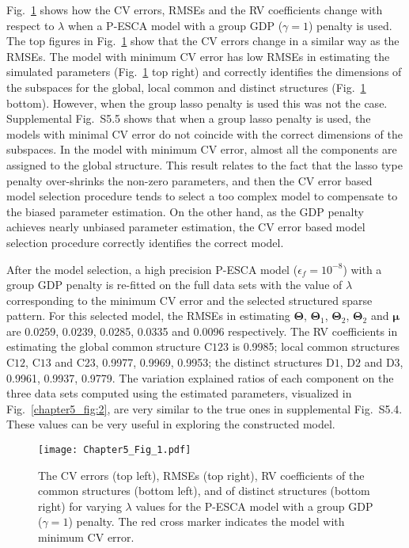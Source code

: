 Fig.~\ref{chapter5_fig:1} shows how the CV errors, RMSEs and the RV coefficients change with respect to $\lambda$ when a P-ESCA model with a group GDP ($\gamma=1$) penalty is used. The top figures in Fig.~\ref{chapter5_fig:1} show that the CV errors change in a similar way as the RMSEs. The model with minimum CV error has low RMSEs in estimating the simulated parameters (Fig.~\ref{chapter5_fig:1} top right) and correctly identifies the dimensions of the subspaces for the global, local common and distinct structures (Fig.~\ref{chapter5_fig:1} bottom). However, when the group lasso penalty is used this was not the case. Supplemental Fig.~S5.5 shows that when a group lasso penalty is used, the models with minimal CV error do not coincide with the correct dimensions of the subspaces. In the model with minimum CV error, almost all the components are assigned to the global structure. This result relates to the fact that the lasso type penalty over-shrinks the non-zero parameters, and then the CV error based model selection procedure tends to select a too complex model to compensate to the biased parameter estimation. On the other hand, as the GDP penalty achieves nearly unbiased parameter estimation, the CV error based model selection procedure correctly identifies the correct model.

After the model selection, a high precision P-ESCA model ($\epsilon_{f} = 10^{-8}$) with a group GDP penalty is re-fitted on the full data sets with the value of $\lambda$ corresponding to the minimum CV error and the selected structured sparse pattern. For this selected model, the RMSEs in estimating $\mathbf{\Theta}$, $\mathbf{\Theta}_1$, $\mathbf{\Theta}_2$, $\mathbf{\Theta}_2$ and $\bm{\mu}$ are 0.0259, 0.0239, 0.0285, 0.0335 and 0.0096 respectively. The RV coefficients in estimating the global common structure $\text{C123}$ is 0.9985; local common structures $\text{C12}$, $\text{C13}$ and $\text{C23}$, 0.9977, 0.9969, 0.9953; the distinct structures $\text{D1}$, $\text{D2}$ and $\text{D3}$, 0.9961, 0.9937, 0.9779. The variation explained ratios of each component on the three data sets computed using the estimated parameters, visualized in Fig.~\ref{chapter5_fig:2}, are very similar to the true ones in supplemental Fig.~S5.4. These values can be very useful in exploring the constructed model.

\begin{figure}[h]
    \center
    \texttt{[image: Chapter5\_Fig\_1.pdf]}
    \caption{The CV errors (top left), RMSEs (top right), RV coefficients of the common structures (bottom left), and of distinct structures (bottom right) for varying $\lambda$ values for the P-ESCA model with a group GDP ($\gamma = 1$) penalty. The red cross marker indicates the model with minimum CV error.}
	\label{chapter5_fig:1}
\end{figure}

